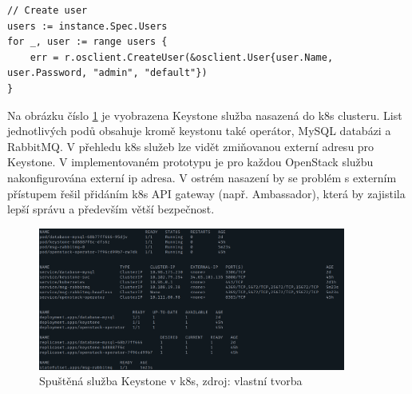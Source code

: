 \begin{lstlisting}[caption={Ukázka tvorby Keystone uživatelů, zdroj: vlastní tvorba},label={lst:oper_user}]
// Create user
users := instance.Spec.Users
for _, user := range users {
	err = r.osclient.CreateUser(&osclient.User{user.Name, user.Password, "admin", "default"})
}
\end{lstlisting}

Na obrázku číslo \ref{fig:kgetall} je vyobrazena Keystone služba nasazená do k8s clusteru. List jednotlivých podů obsahuje kromě keystonu také operátor, MySQL databázi a RabbitMQ. V přehledu k8s služeb lze vidět zmiňovanou externí adresu pro Keystone. V implementovaném prototypu je pro každou OpenStack službu nakonfigurována externí ip adresa. V ostrém nasazení by se problém s externím přístupem řešil přidáním k8s API gateway (např. Ambassador), která by zajistila lepší správu a především větší bezpečnost.

\begin{figure}[H]
\begin{centering}
\includegraphics[width=0.9\textwidth]{img/kgetkeystone.png}
\par\end{centering}
\caption{Spuštěná služba Keystone v k8s, zdroj: vlastní tvorba} \label{fig:kgetall}
\end{figure}